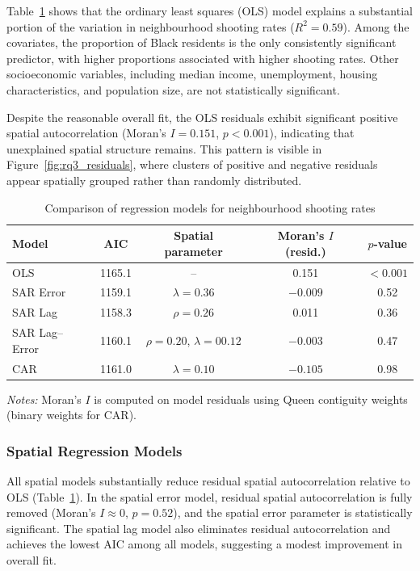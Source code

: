 \documentclass{article}
\begin{document}
\noindent Table~\ref{tab:rq3_models} shows that the ordinary least squares (OLS) model explains a substantial portion of the variation in neighbourhood shooting rates ($R^2 = 0.59$). Among the covariates, the proportion of Black residents is the only consistently significant predictor, with higher proportions associated with higher shooting rates. Other socioeconomic variables, including median income, unemployment, housing characteristics, and population size, are not statistically significant.

\noindent Despite the reasonable overall fit, the OLS residuals exhibit significant positive spatial autocorrelation (Moran’s $I = 0.151$, $p < 0.001$), indicating that unexplained spatial structure remains. This pattern is visible in Figure~\ref{fig:rq3_residuals}, where clusters of positive and negative residuals appear spatially grouped rather than randomly distributed.

\begin{table}[ht]
\centering
\caption{Comparison of regression models for neighbourhood shooting rates}
\label{tab:rq3_models}
\begin{tabular}{lcccc}
\hline
Model & AIC & Spatial parameter & Moran’s $I$ (resid.) & $p$-value \\
\hline
OLS & 1165.1 & -- & 0.151 & $<0.001$ \\
SAR Error & 1159.1 & $\lambda = 0.36$ & $-0.009$ & 0.52 \\
SAR Lag & 1158.3 & $\rho = 0.26$ & 0.011 & 0.36 \\
SAR Lag--Error & 1160.1 & $\rho = 0.20$, $\lambda = 00.12$ & $-0.003$ & 0.47 \\
CAR & 1161.0 & $\lambda = 0.10$ & $-0.105$ & 0.98 \\
\hline
\end{tabular}

\vspace{0.5em}
\footnotesize
\textit{Notes:} Moran’s $I$ is computed on model residuals using Queen contiguity weights (binary weights for CAR).
\end{table}

\subsubsection{Spatial Regression Models}

\noindent All spatial models substantially reduce residual spatial autocorrelation relative to OLS (Table~\ref{tab:rq3_models}). In the spatial error model, residual spatial autocorrelation is fully removed (Moran’s $I \approx 0$, $p = 0.52$), and the spatial error parameter is statistically significant. The spatial lag model also eliminates residual autocorrelation and achieves the lowest AIC among all models, suggesting a modest improvement in overall fit.
\end{document}
